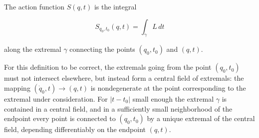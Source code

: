 The action function $S(q, t)$ is the integral

$$S_{q_0, t_0}(q, t) = \int_{\gamma} L \, dt$$

along the extremal $\gamma$ connecting the points $(q_0, t_0)$ and $(q, t)$.

For this definition to be correct, the extremals going from the point $(q_0, t_0)$ must not intersect elsewhere, but instead form a central field of extremals: the mapping $(\dot{q}_0, t) \to (q, t)$ is nondegenerate at the point corresponding to the extremal under consideration. For $|t - t_0|$ small enough the extremal $\gamma$ is contained in a central field, and in a sufficiently small neighborhood of the endpoint every point is connected to $(q_0, t_0)$ by a unique extremal of the central field, depending differentiably on the endpoint $(q, t)$.

